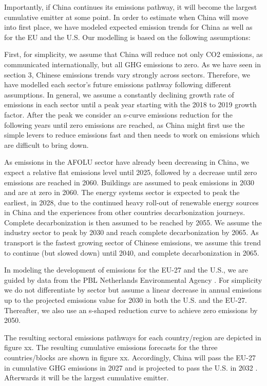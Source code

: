 \documentclass[
  12pt,
]{article}
\numberwithin{equation}{section}
\numberwithin{table}{section}
\numberwithin{figure}{section}
\begin{document}
Importantly, if China continues its emissions pathway, it will become
the largest cumulative emitter at some point. In order to estimate when
China will move into first place, we have modeled expected emission
trends for China as well as for the EU and the U.S. Our modelling is
based on the following assumptions:

First, for simplicity, we assume that China will reduce not only CO2
emissions, as communicated internationally, but all GHG emissions to
zero. As we have seen in section 3, Chinese emissions trends vary
strongly across sectors. Therefore, we have modelled each sector's
future emissions pathway following different assumptions. In general, we
assume a constantly declining growth rate of emissions in each sector
until a peak year starting with the 2018 to 2019 growth factor. After
the peak we consider an s-curve emissions reduction for the following
years until zero emissions are reached, as China might first use the
simple levers to reduce emissions fast and then needs to work on
emissions which are difficult to bring down.

As emissions in the AFOLU sector have already been decreasing in China,
we expect a relative flat emissions level until 2025, followed by a
decrease until zero emissions are reached in 2060. Buildings are assumed
to peak emissions in 2030 and are at zero in 2060. The energy systems
sector is expected to peak the earliest, in 2028, due to the continued
heavy roll-out of renewable energy sources in China and the experiences
from other countries decarbonization journeys. Complete decarbonization
is then assumed to be reached by 2055. We assume the industry sector to
peak by 2030 and reach complete decarbonization by 2065. As transport is
the fastest growing sector of Chinese emissions, we assume this trend to
continue (but slowed down) until 2040, and complete decarbonization in
2065.

In modeling the development of emissions for the EU-27 and the U.S., we
are guided by data from the PBL Netherlands Environmental Agency
\citep{PBL2022}. For simplicity we do not differentiate by sector but
assume a linear decrease in annual emissions up to the projected
emissions value for 2030 in both the U.S. and the EU-27. Thereafter, we
also use an s-shaped reduction curve to achieve zero emissions by 2050.

The resulting sectoral emissions pathways for each country/region are
depicted in figure xx. The resulting cumulative emissions forecasts for
the three countries/blocks are shown in figure xx. Accordingly, China
will pass the EU-27 in cumulative GHG emissions in 2027 and is projected
to pass the U.S. in 2032 . Afterwards it will be the largest cumulative
emitter.
\end{document}
